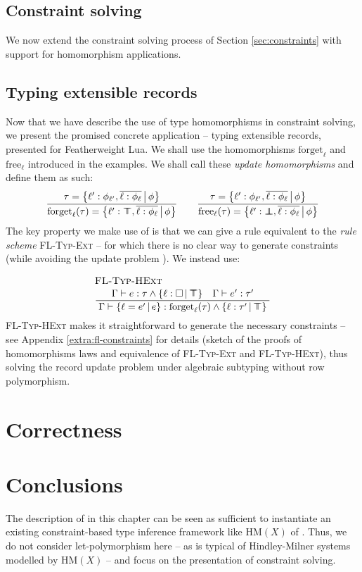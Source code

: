 \subsection{Constraint solving}

We now extend the constraint solving process of Section \ref{sec:constraints} with support for homomorphism applications.\todo[color=red]{}

\subsection{Typing extensible records}
Now that we have describe the use of type homomorphisms in constraint solving, we present the promised concrete application -- typing extensible records, presented for Featherweight Lua. We shall use the homomorphisms $\mathrm{forget}_\ell$ and $\mathrm{free}_\ell$ introduced in the examples. We shall call these \emph{update homomorphisms} and define them as such:
$$ 
\dfrac
  {\tau = \flext{\ell' : \phi_{\ell'},  \overline{\ell : \phi_\ell}}{\phi}}
  {\mathrm{forget}_\ell(\tau) = \flext{\ell' : \flftop,  \overline{\ell : \phi_\ell}}{\phi}}
\qquad 
\dfrac
  {\tau = \flext{\ell' : \phi_{\ell'},  \overline{\ell : \phi_\ell}}{\phi}}
  {\mathrm{free}_\ell(\tau) = \flext{\ell' : \flfbot,  \overline{\ell : \phi_\ell}}{\phi}}
$$
The key property we make use of is that we can give a rule equivalent to the \emph{rule scheme} \textsc{FL-Typ-Ext} -- for which there is no clear way to generate constraints (while avoiding the update problem \cite{operations-on-records}). We instead use:
$$ 
\irule{FL-Typ-HExt}{\Gamma \vdash e : \tau \meet \flext{\ell : \flabsent}{\flftop} \quad \Gamma \vdash e' : \tau'}{\Gamma \vdash \flext{\ell = e'}{e} : \mathrm{forget}_\ell(\tau) \meet \flext{\ell : \tau'}{\flftop}}
$$
\textsc{FL-Typ-HExt} makes it straightforward to generate the necessary constraints -- see Appendix \ref{extra:fl-constraints} for details (sketch of the proofs of homomorphisms laws and equivalence of \textsc{FL-Typ-Ext} and \textsc{FL-Typ-HExt}), thus solving the record update problem under algebraic subtyping without row polymorphism.

\section{Correctness}
\label{sec:correctness}
\todo[color=red]{}

\section{Conclusions}
\label{sec:conclusions}
\todo[color=red]{}

The description of \inference{} in this chapter can be seen as sufficient to instantiate an existing constraint-based type inference framework like $\mathrm{HM}(X)$ of \textcite{constraint-based-hm}. Thus, we do not consider let-polymorphism here -- as is typical of Hindley-Milner systems modelled by $\mathrm{HM}(X)$ -- and focus on the presentation of constraint solving.


